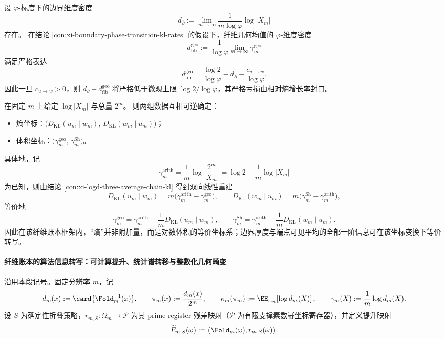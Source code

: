 \begin{conclusion}\label{con:xi-fractal-dimension-entropy-deficit}
设 \(\varphi\)-标度下的边界维度密度
\[
d_\partial:=\lim_{m\to\infty}\frac{1}{m\log\varphi}\log|X_m|
\]
存在。
在结论 \ref{con:xi-boundary-phase-transition-kl-rates} 的假设下，纤维几何均值的 \(\varphi\)-维度密度
\[
d_{\mathrm{fib}}^{\mathrm{geo}}
:=\frac{1}{\log\varphi}\lim_{m\to\infty}\gamma_m^{\mathrm{geo}}
\]
满足严格表达
\[
d_{\mathrm{fib}}^{\mathrm{geo}}=\frac{\log 2}{\log\varphi}-d_\partial-\frac{c_{u\to w}}{\log\varphi}.
\]
因此一旦 \(c_{u\to w}>0\)，则 \(d_\partial+d_{\mathrm{fib}}^{\mathrm{geo}}\) 将严格低于微观上限 \(\log 2/\log\varphi\)，其严格亏损由相对熵增长率封口。
\end{conclusion}

\begin{conclusion}\label{con:xi-entropy-volume-dual-coordinates}
在固定 \(m\) 上给定 \(\log|X_m|\) 与总量 \(2^m\)。
则两组数据互相可逆确定：
\begin{itemize}
  \item 熵坐标：\(\bigl(D_{\mathrm{KL}}(u_m\mid w_m),\,D_{\mathrm{KL}}(w_m\mid u_m)\bigr)\)；
  \item 体积坐标：\(\bigl(\gamma_m^{\mathrm{geo}},\,\gamma_m^{\mathrm{Sh}}\bigr)\)。
\end{itemize}
具体地，记
\[
\gamma_m^{\mathrm{arith}}
=\frac{1}{m}\log\frac{2^m}{|X_m|}
=\log 2-\frac{1}{m}\log|X_m|
\]
为已知，则由结论 \ref{con:xi-logd-three-average-chain-kl} 得到双向线性重建
\[
D_{\mathrm{KL}}(u_m\mid w_m)=m\bigl(\gamma_m^{\mathrm{arith}}-\gamma_m^{\mathrm{geo}}\bigr),
\qquad
D_{\mathrm{KL}}(w_m\mid u_m)=m\bigl(\gamma_m^{\mathrm{Sh}}-\gamma_m^{\mathrm{arith}}\bigr),
\]
等价地
\[
\gamma_m^{\mathrm{geo}}=\gamma_m^{\mathrm{arith}}-\frac{1}{m}D_{\mathrm{KL}}(u_m\mid w_m),
\qquad
\gamma_m^{\mathrm{Sh}}=\gamma_m^{\mathrm{arith}}+\frac{1}{m}D_{\mathrm{KL}}(w_m\mid u_m).
\]
因此在该纤维账本框架内，“熵”并非附加量，而是对数体积的等价坐标系；边界厚度与端点可见平均的全部一阶信息可在该坐标变换下等价转写。
\end{conclusion}

\paragraph{纤维账本的算法信息转写：可计算提升、统计谱转移与整数化几何畸变}
沿用本段记号。固定分辨率 \(m\)，记
\[
d_m(x):=\card{\Fold_m^{-1}(x)},
\qquad
\pi_m(x):=\frac{d_m(x)}{2^m},
\qquad
\kappa_m(\pi_m):=\EE_{\pi_m}\!\left[\log d_m(X)\right],
\qquad
\gamma_m(X):=\frac{1}{m}\log d_m(X).
\]
设 \(S\) 为确定性折叠策略，\(r_{m,S}:\Omega_m\to\mathcal P\) 为其 prime-register 残差映射（\(\mathcal P\) 为有限支撑素数幂坐标寄存器），并定义提升映射
\[
\widetilde F_{m,S}(\omega):=\bigl(\Fold_m(\omega),r_{m,S}(\omega)\bigr).
\]

